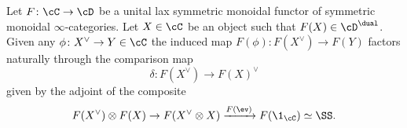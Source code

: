 \begin{lem}
  Let $F\colon \cC\to \cD$ be a unital lax symmetric monoidal functor of symmetric monoidal $\infty$-categories. Let $X\in \cC$ be an object such that $F(X)\in \cD^{\dual}$.
  Given any $\phi \colon X^{\vee}\to Y \in \cC$ the induced map $F(\phi)\colon F(X^{\vee}) \to F(Y)$
  factors naturally through the comparison map
  \[\delta\colon F(X^{\vee})\to F(X)^{\vee}\]
  given by the adjoint of the composite 
  \[ F(X^{\vee})\otimes F(X) \to F(X^{\vee}\otimes X) \xrightarrow{F(\ev)} F(\1_{\cC})\simeq \SS.\]
\end{lem}






